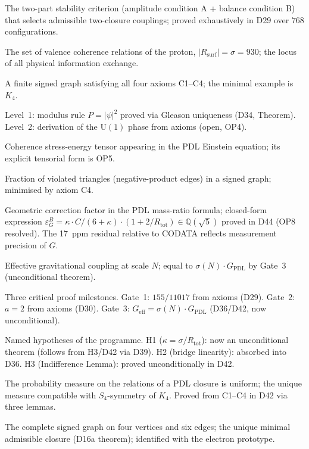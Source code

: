 \documentclass[11pt,a4paper]{article}
\theoremstyle{plain}
\theoremstyle{definition}
\theoremstyle{remark}
\newcommand{\Geff}{G_{\mathrm{eff}}}
\newcommand{\GPDL}{G_{\mathrm{PDL}}}
\newcommand{\Rsurf}{R_{\mathrm{surf}}}
\newcommand{\Rtot}{R_{\mathrm{tot}}}
\newcommand{\sigmaN}{\sigma(N)}
\newcommand{\epsGeomB}{\varepsilon_G^B}
\begin{document}
\begin{description}[leftmargin=3.5cm, style=nextline]
\item[AB criterion] The two-part stability criterion (amplitude condition A + balance condition B) that selects admissible two-closure couplings; proved exhaustively in D29 over $768$ configurations.
\item[Active surface $\Rsurf$] The set of valence coherence relations of the proton, $|\Rsurf|=\sigma=930$; the locus of all physical information exchange.
\item[Admissible closure] A finite signed graph satisfying all four axioms C1--C4; the minimal example is $K_4$.
\item[Born Level~1 / Level~2] Level~1: modulus rule $P=|\psi|^2$ proved via Gleason uniqueness (D34, Theorem). Level~2: derivation of the $\mathrm{U}(1)$ phase from axioms (open, OP4).
\item[$C_{\mathrm{coh}}$] Coherence stress-energy tensor appearing in the PDL Einstein equation; its explicit tensorial form is OP5.
\item[Coherence cost] Fraction of violated triangles (negative-product edges) in a signed graph; minimised by axiom C4.
\item[$\epsGeomB$] Geometric correction factor in the PDL mass-ratio formula; closed-form expression $\epsGeomB = \kappa \cdot C/(6+\kappa)\cdot(1+2/\Rtot) \in \mathbb{Q}(\sqrt{5})$ proved in D44 (OP8 resolved). The 17~ppm residual relative to CODATA reflects measurement precision of $G$.
\item[$\Geff(N)$] Effective gravitational coupling at scale $N$; equal to $\sigmaN\cdot\GPDL$ by Gate~3 (unconditional theorem).
\item[Gate 1, 2, 3] Three critical proof milestones. Gate~1: $155/11017$ from axioms (D29). Gate~2: $a=2$ from axioms (D30). Gate~3: $\Geff=\sigmaN\cdot\GPDL$ (D36/D42, now unconditional).
\item[H1, H2, H3] Named hypotheses of the programme. H1 ($\kappa=\sigma/R_{\mathrm{tot}}$): now an unconditional theorem (follows from H3/D42 via D39). H2 (bridge linearity): absorbed into D36. H3 (Indifference Lemma): proved unconditionally in D42.
\item[Indifference Lemma (H3)] The probability measure on the relations of a PDL closure is uniform; the unique measure compatible with $S_4$-symmetry of $K_4$. Proved from C1--C4 in D42 via three lemmas.
\item[$K_4$] The complete signed graph on four vertices and six edges; the unique minimal admissible closure (D16a theorem); identified with the electron prototype.

\end{description}
\end{document}
